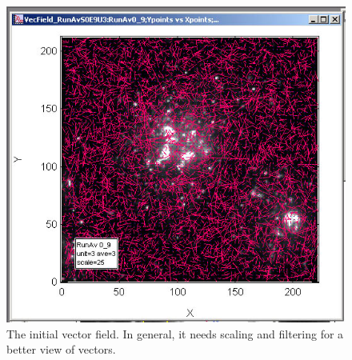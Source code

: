 \documentclass{article}
\begin{document}
\begin{figure}[!ht]
\begin{center}
\includegraphics[scale=0.4]{img/image032.jpg}
\caption{ The initial vector field. In general, it needs scaling and filtering for a better view of vectors.}
\label{fig:initialVF}
\end{center}
\end{figure}
\end{document}
